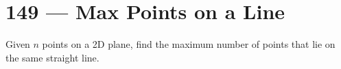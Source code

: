 \section{149 --- Max Points on a Line}
Given $n$ points on a 2D plane, find the maximum number of points that lie on the same straight line.